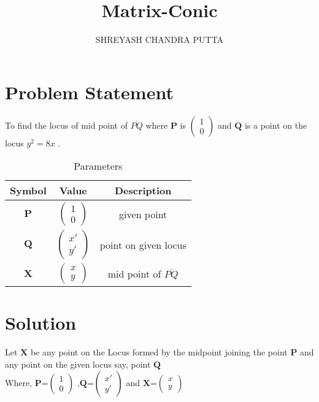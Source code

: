 \documentclass[journal,12pt,twocolumn]{article}
\title{
Matrix-Conic
}
\author{SHREYASH CHANDRA PUTTA}
\newcommand{\myvec}[1]{\ensuremath{\begin{pmatrix}#1\end{pmatrix}}}
\let\vec\mathbf
\begin{document}
\maketitle
\tableofcontents
\bigskip
\section{Problem Statement}
To find the locus of mid point of $\overline{PQ}$ where $\vec{P}$ is $\myvec{ 1\\0}$ and $\vec{Q}$ is a point on the locus $y^{2} = 8x$ .

\begin{table}[h]
    \centering
    \begin{tabular}{|c|c|c|}
       \hline
       \textbf{Symbol}&\textbf{Value}&\textbf{Description}  \\
       \hline
	    $\vec{P}$ & $\myvec{
		    1\\
		    0}$
	    & given point\\
        \hline
	    $\vec{Q}$ & $\myvec{x'\\y'}$
 &  point on given locus \\
 
        \hline
	    $\vec{X}$ & $\myvec{x\\y}$
 & mid point of $\overline{PQ}$  \\
       \hline
    \end{tabular}
    \caption{Parameters}
    \label{tab:my_label}
\end{table}


\section{Solution}
Let $\vec{X}$ be any point on the Locus formed by the midpoint joining the point $\vec{P}$ and any point on the given locus say, point $\vec{Q}$  \\

Where, 
  ${\vec{P}}$=$\myvec{
  1\\
  0}$
  ,${\vec{Q}}$=$\myvec{
  x'\\
  y'}$
 and ${\vec{X}}$=$\myvec{
  x\\
  y}$
\end{document}
